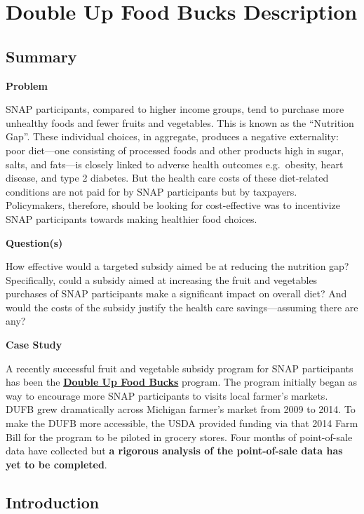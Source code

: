 \documentclass[11pt,letterpaper,]{book}
\begin{document}
\chapter{Double Up Food Bucks Description}\label{DUFB}

\section{Summary}\label{summary}

\textbf{Problem}

SNAP participants, compared to higher income groups, tend to purchase
more unhealthy foods and fewer fruits and vegetables. This is known as
the ``Nutrition Gap''. These individual choices, in aggregate, produces
a negative externality: poor diet---one consisting of processed foods
and other products high in sugar, salts, and fats---is closely linked to
adverse health outcomes e.g.~obesity, heart disease, and type 2
diabetes. But the health care costs of these diet-related conditions are
not paid for by SNAP participants but by taxpayers. Policymakers,
therefore, should be looking for cost-effective was to incentivize SNAP
participants towards making healthier food choices.

\textbf{Question(s)}

How effective would a targeted subsidy aimed be at reducing the
nutrition gap? Specifically, could a subsidy aimed at increasing the
fruit and vegetables purchases of SNAP participants make a significant
impact on overall diet? And would the costs of the subsidy justify the
health care savings---assuming there are any?

\textbf{Case Study}

A recently successful fruit and vegetable subsidy program for SNAP
participants has been the
\href{http://www.doubleupfoodbucks.org/}{\textbf{Double Up Food Bucks}}
program. The program initially began as way to encourage more SNAP
participants to visits local farmer's markets. DUFB grew dramatically
across Michigan farmer's market from 2009 to 2014. To make the DUFB more
accessible, the USDA provided funding via that 2014 Farm Bill for the
program to be piloted in grocery stores. Four months of point-of-sale
data have collected but \textbf{a rigorous analysis of the point-of-sale
data has yet to be completed}.

\section{Introduction}\label{introduction}
\end{document}
